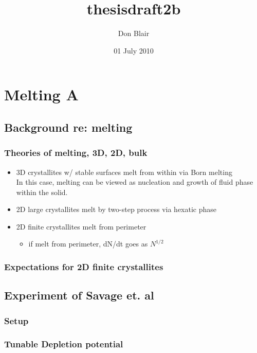 \documentclass{umthesis}
\title{thesisdraft2b}
\author{Don Blair}
\date{01 July 2010}
\begin{document}
\setcounter{tocdepth}{3}
\tableofcontents
\vspace*{1cm}
\chapter{Melting A}
\label{sec-1}
\section{Background re: melting}
\label{sec-1.1}
\subsection{Theories of melting, 3D, 2D, bulk}
\label{sec-1.1.1}
\begin{itemize}

\item 3D crystallites w/ stable surfaces melt from within via Born melting\\
\label{sec-1.1.1.1}%
In this case, melting can be viewed as nucleation and growth of fluid phase within the solid.

\item 2D large crystallites melt by two-step process via hexatic phase\\
\label{sec-1.1.1.2}%
\item 2D finite crystallites melt from perimeter
\label{sec-1.1.1.3}%
\begin{itemize}

\item if melt from perimeter, dN/dt goes as $N^{1/2}$\\
\label{sec-1.1.1.3.1}%
\end{itemize} %
\end{itemize} %
\subsection{Expectations for 2D finite crystallites}
\label{sec-1.1.2}
\section{Experiment of Savage et. al}
\label{sec-1.2}
\subsection{Setup}
\label{sec-1.2.1}
\subsection{Tunable Depletion potential}
\label{sec-1.2.2}
\end{document}
